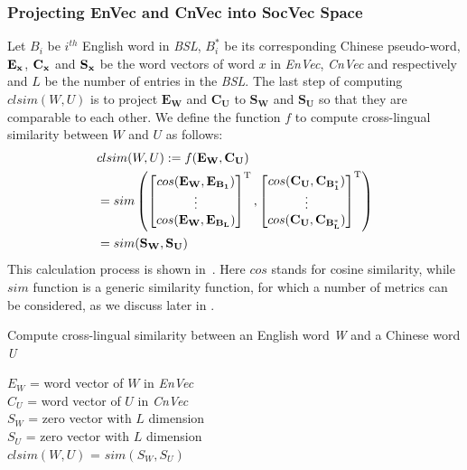 \subsubsection{Projecting EnVec and CnVec into SocVec Space}
Let $B_i$ be $i^{th}$ English word in \textit{BSL},  $B_{i}^*$ be its corresponding Chinese pseudo-word, $\bf{E_x}$, $\bf{C_x}$ and $\bf{S_x}$ be the word vectors of word $x$ in \textit{EnVec}, \textit{CnVec} and \textit{\socvec} respectively and $L$ be the number of entries in the \textit{BSL}. The last step of computing $clsim(W,U)$ is to project $\mathbf{E_W}$ and $\mathbf{C_U}$ to $\mathbf{S_W}$ and $\mathbf{S_U}$ so that they are comparable to each other.
We define the function $f$ to compute cross-lingual similarity between $W$ and $U$ as follows:
\small
\begin{align*}
&clsim(W,U) := f(\mathbf{E_W},\mathbf{C_U}) \\ 
&=sim\left(
\begin{bmatrix}
    cos(\mathbf{E_W},\mathbf{E_{B_1}})\\
    \vdots \\
    cos(\mathbf{E_W},\mathbf{E_{B_L}})
\end{bmatrix}^{\rm T},\begin{bmatrix}
    cos(\mathbf{C_U},\mathbf{C_{B_1^*}})\\
    \vdots \\
    cos(\mathbf{C_U},\mathbf{C_{B_L^*}})
\end{bmatrix}^{\rm T}\right)\\
&=sim(\mathbf{S_W},\mathbf{S_U}) 
\end{align*}
This calculation process is shown in~. Here $cos$ stands for cosine similarity, while $sim$ function is a generic similarity
function, for which a number of
metrics can be considered, as we discuss later in .
\begin{algorithm}[th]
	\DontPrintSemicolon
	\caption{Compute cross-lingual similarity between an English word 
	\textit{W} and a Chinese word \textit{U} } 
    \label{alg:alg1}
	$E_W$ = word vector of $W$ in \textit{EnVec}\\
	$C_U$ = word vector of $U$ in \textit{CnVec}\\
	$S_W$ =  zero vector with $L$ dimension \\
	$S_U$ =  zero vector with $L$ dimension \\
	\Return $clsim(W,U)$ = $sim(S_W,S_U)$\\
\end{algorithm}

